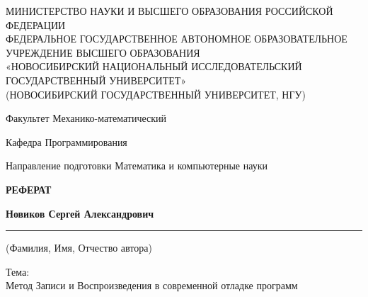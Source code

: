 \thispagestyle{empty}

\begin{center}
  МИНИСТЕРСТВО НАУКИ И ВЫСШЕГО ОБРАЗОВАНИЯ РОССИЙСКОЙ ФЕДЕРАЦИИ \\
  ФЕДЕРАЛЬНОЕ ГОСУДАРСТВЕННОЕ АВТОНОМНОЕ ОБРАЗОВАТЕЛЬНОЕ УЧРЕЖДЕНИЕ ВЫСШЕГО ОБРАЗОВАНИЯ \\
  «НОВОСИБИРСКИЙ НАЦИОНАЛЬНЫЙ ИССЛЕДОВАТЕЛЬСКИЙ ГОСУДАРСТВЕННЫЙ УНИВЕРСИТЕТ» \\
  (НОВОСИБИРСКИЙ ГОСУДАРСТВЕННЫЙ УНИВЕРСИТЕТ, НГУ)
\end{center}

\vspace{1.5cm}

\noindent %
Факультет \hfill Механико-математический \par

\vspace{1cm}

\noindent
Кафедра \hfill Программирования \par
\noindent
Направление подготовки \hfill Математика и компьютерные науки

\vspace{2cm}

\begin{center}
  \vspace{1em} %
  {\Large \textbf{РЕФЕРАТ}} %
  \vspace{1em} %
\end{center}


\begin{center}
  \textbf{Новиков Сергей Александрович}
  \rule[0.5ex]{\linewidth}{0.4pt}
  \small (Фамилия, Имя, Отчество автора)
\end{center}

\vspace{1.5cm}

\noindent
Тема: \\
Метод Записи и Воспроизведения в современной отладке программ %

\vspace{1.5cm}

